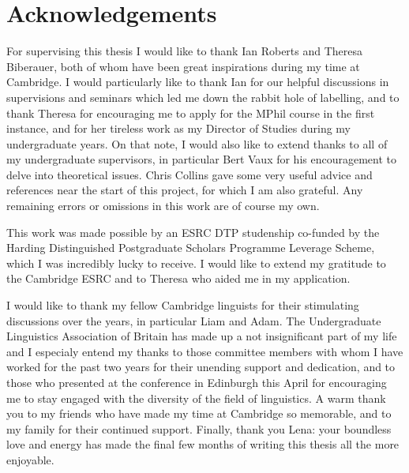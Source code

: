\section*{Acknowledgements}

For supervising this thesis I would like to thank Ian Roberts and Theresa Biberauer, both of whom have been great inspirations during my time at Cambridge. I would particularly like to thank Ian for our helpful discussions in supervisions and seminars which led me down the rabbit hole of labelling, and to thank Theresa for encouraging me to apply for the MPhil course in the first instance, and for her tireless work as my Director of Studies during my undergraduate years. On that note, I would also like to extend thanks to all of my undergraduate supervisors, in particular Bert Vaux for his encouragement to delve into theoretical issues. Chris Collins gave some very useful advice and references near the start of this project, for which I am also grateful. Any remaining errors or omissions in this work are of course my own.

This work was made possible by an ESRC DTP studenship co-funded by the Harding Distinguished Postgraduate Scholars Programme Leverage Scheme, which I was incredibly lucky to receive. I would like to extend my gratitude to the Cambridge ESRC and to Theresa who aided me in my application.

I would like to thank my fellow Cambridge linguists for their stimulating discussions over the years, in particular Liam and Adam. The Undergraduate Linguistics Association of Britain has made up a not insignificant part of my life and I especialy entend my thanks to those committee members with whom I have worked for the past two years for their unending support and dedication, and to those who presented at the conference in Edinburgh this April for encouraging me to stay engaged with the diversity of the field of linguistics. A warm thank you to my friends who have made my time at Cambridge so memorable, and to my family for their continued support. Finally, thank you Lena: your boundless love and energy has made the final few months of writing this thesis all the more enjoyable.

